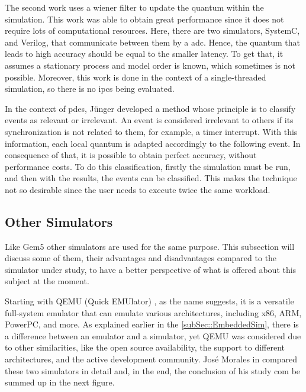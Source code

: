 The second work uses a wiener filter to update the quantum within the simulation. This work was able to obtain great performance since it 
does not require lots of computational resources. Here, there are two simulators, SystemC, and Verilog, that communicate between them by 
a \gls{adc}. Hence, the quantum that leads to high accuracy should be equal to the smaller latency. To get that, it assumes a stationary 
process and model order is known, which sometimes is not possible. Moreover, this work is done in the context of a single-threaded simulation, 
so there is no \glspl{ipc} being evaluated.

In the context of \gls{pdes}, Jünger developed a method whose principle is to classify events as relevant or irrelevant. An event is considered 
irrelevant to others if its synchronization is not related to them, for example, a timer interrupt. With this information, each local quantum is 
adapted accordingly to the following event. In consequence of that, it is possible to obtain perfect accuracy, without performance costs. To do 
this classification, firstly the simulation must be run, and then with the results, the events can be classified. This makes the technique not so 
desirable since the user needs to execute twice the same workload. 


\subsection{Other Simulators}


Like Gem5 other simulators are used for the same purpose. This subsection will discuss some of them, their advantages and disadvantages 
compared to the simulator under study, to have a better perspective of what is offered about this subject at the moment. 

Starting with QEMU (Quick EMUlator) \cite{theQEMUsimulator}, as the name suggests, it is a versatile full-system emulator that can emulate 
various architectures, including x86, ARM, PowerPC, and more. As explained earlier in the \autoref{subSec::EmbeddedSim}, there is a difference 
between an emulator and a simulator, yet QEMU was considered due to other similarities, like the open source availability, the support to 
different architectures, and the active development community. José Morales in \cite{morales2016evaluating} compared these two simulators in 
detail and, in the end, the conclusion of his study com be summed up in the next figure.

